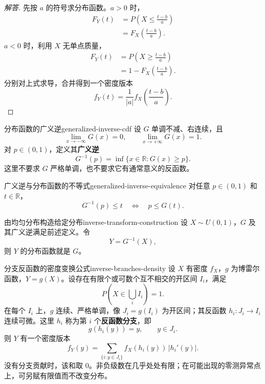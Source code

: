 \begin{proof}[解答]
先按 $a$ 的符号求分布函数。$a>0$ 时，
\[
\begin{aligned}
F_Y(t)
&=P\left(X\leq\frac{t-b}{a}\right)\\
&=F_X\left(\frac{t-b}{a}\right).
\end{aligned}
\]
$a<0$ 时，利用 $X$ 无单点质量，
\[
\begin{aligned}
F_Y(t)
&=P\left(X\geq\frac{t-b}{a}\right)\\
&=1-F_X\left(\frac{t-b}{a}\right).
\end{aligned}
\]
分别对上式求导，合并得到一个密度版本
\[
\boxed{\quad f_Y(t)=\frac1{|a|}f_X\left(\frac{t-b}{a}\right).\quad}
\]
\end{proof}

\begin{mydefinition}{分布函数的广义逆}{generalized-inverse-cdf}
设 $G$ 单调不减、右连续，且
\[
\lim_{x\to-\infty}G(x)=0,\qquad
\lim_{x\to+\infty}G(x)=1.
\]
对 $p\in(0,1)$，定义其\textbf{广义逆}
\[
G^{-1}(p)=\inf\{x\in\mathbb R:G(x)\geq p\}.
\]
这里不要求 $G$ 严格单调，也不要求它有通常意义的反函数。
\end{mydefinition}

\begin{mylemma}{广义逆与分布函数的不等式}{generalized-inverse-equivalence}
对任意 $p\in(0,1)$ 和 $t\in\mathbb R$，
\[
G^{-1}(p)\leq t\quad\Longleftrightarrow\quad p\leq G(t).
\]
\end{mylemma}

\begin{mytheorem}{由均匀分布构造给定分布}{inverse-transform-construction}
设 $X\sim U(0,1)$，$G$ 及其广义逆满足前述定义。令
\[
Y=G^{-1}(X),
\]
则 $Y$ 的分布函数就是 $G$。
\end{mytheorem}

\begin{mytheorem}{分支反函数的密度变换公式}{inverse-branches-density}
设 $X$ 有密度 $f_X$，$g$ 为博雷尔函数，$Y=g(X)$。设存在有限个或可数个互不相交的开区间 $I_i$，满足
\[
P\left(X\in\bigcup_i I_i\right)=1.
\]
在每个 $I_i$ 上，$g$ 连续、严格单调，像 $J_i=g(I_i)$ 为开区间；其反函数 $h_i:J_i\to I_i$ 连续可微。这里 $h_i$ 称为第 $i$ 个\textbf{反函数分支}，即
\[
g(h_i(y))=y,\qquad y\in J_i.
\]
则 $Y$ 有一个密度版本
\[
f_Y(y)=\sum_{\{i:y\in J_i\}}f_X(h_i(y))\,|h_i'(y)|.
\]
没有分支贡献时，该和取 $0$。非负级数在几乎处处有限；在可能出现的零测异常点上，可另赋有限值而不改变分布。
\end{mytheorem}


